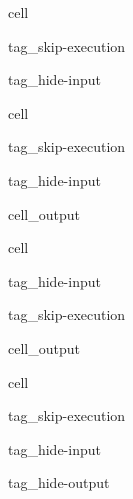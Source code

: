 \documentclass[letterpaper,10pt,english,openany,oneside]{jupyterBook}
\begin{document}
\begin{sphinxuseclass}{cell}
\begin{sphinxuseclass}{tag_skip-execution}
\begin{sphinxuseclass}{tag_hide-input}
\end{sphinxuseclass}
\end{sphinxuseclass}
\end{sphinxuseclass}
\begin{sphinxuseclass}{cell}
\begin{sphinxuseclass}{tag_skip-execution}
\begin{sphinxuseclass}{tag_hide-input}\begin{sphinxVerbatimOutput}

\begin{sphinxuseclass}{cell_output}
\noindent{}

\end{sphinxuseclass}\end{sphinxVerbatimOutput}

\end{sphinxuseclass}
\end{sphinxuseclass}
\end{sphinxuseclass}
\begin{sphinxuseclass}{cell}
\begin{sphinxuseclass}{tag_hide-input}
\begin{sphinxuseclass}{tag_skip-execution}\begin{sphinxVerbatimOutput}

\begin{sphinxuseclass}{cell_output}
\noindent{}

\end{sphinxuseclass}\end{sphinxVerbatimOutput}

\end{sphinxuseclass}
\end{sphinxuseclass}
\end{sphinxuseclass}
\begin{sphinxuseclass}{cell}
\begin{sphinxuseclass}{tag_skip-execution}
\begin{sphinxuseclass}{tag_hide-input}
\begin{sphinxuseclass}{tag_hide-output}
\end{sphinxuseclass}
\end{sphinxuseclass}
\end{sphinxuseclass}
\end{sphinxuseclass}
\end{document}
